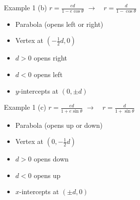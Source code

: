 \documentclass[t,usenames,dvipsnames]{beamer}
\begin{document}
\begin{frame}{Example 1}
(b) \quad $r = \frac{ed}{1-e\cos\theta}$        \pause    \quad $\longrightarrow \quad r = \frac{d}{1-\cos\theta}$ \newline\\ \pause
    \begin{itemize}
        \item Parabola (opens left or right)  \pause  \newline\\
        \item Vertex at $\left(-\frac{1}{2}d, 0\right)$ \pause \newline\\
        \item $d > 0$ opens right    \pause  \newline\\
        \item $d < 0$ opens left   \pause  \newline\\
        \item $y$-intercepts at $\left(0, \pm d\right)$
    \end{itemize}
\end{frame}

\begin{frame}{Example 1}
(c) \quad $r = \frac{ed}{1+e\sin\theta}$    \pause    \quad $\longrightarrow \quad r = \frac{d}{1+\sin\theta}$ \newline\\ \pause
    \begin{itemize}
        \item Parabola (opens up or down)  \pause  \newline\\
        \item Vertex at $\left(0, -\frac{1}{2}d\right)$ \pause \newline\\
        \item $d > 0$ opens down    \pause  \newline\\
        \item $d < 0$ opens up   \pause  \newline\\
        \item $x$-intercepts at $\left(\pm d, 0\right)$
    \end{itemize}
\end{frame}
\end{document}
